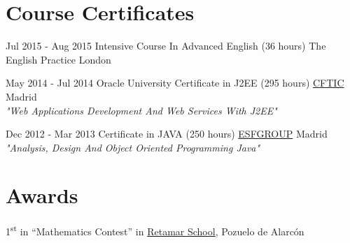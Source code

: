 \documentclass[letterpaper]{twentysecondcv} %
\begin{document}
\section{Course Certificates}
\begin{twenty}
	\twentyitem
    	{Jul 2015 -}
		{Aug 2015}
        {Intensive Course In Advanced English (36 hours)}
        {The English Practice}
        {}
        {London}
\end{twenty}

\begin{twenty}
	\twentyitem
    	{May 2014 -}
		{Jul 2014}
        {Oracle University Certificate in J2EE (295 hours)}
        {\href{https://cftic.centrosdeformacion.empleo.madrid.org/}{CFTIC}}
        {}
        {Madrid\\
        \textit{"Web Applications Development And Web Services With J2EE"}}      
\end{twenty}

\begin{twenty}
	\twentyitem
    	{Dec 2012 -}
		{Mar 2013}
        {Certificate in JAVA (250 hours)}
        {\href{http://www.esf.es/}{ESFGROUP}}
        {}
        {Madrid\\
        \textit{"Analysis, Design And Object Oriented Programming Java"}}      
\end{twenty}

\section{Awards}

1\textsuperscript{st} in “Mathematics Contest” in \href{http://retamar.com/}{Retamar School}, Pozuelo de Alarcón
\end{document}
